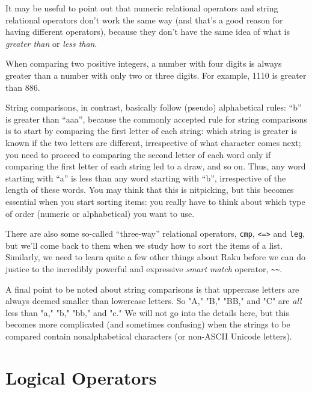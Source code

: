 It may be useful to point out that numeric relational operators 
and string relational operators don't work the same way (and 
that's a good reason for having different operators), because 
they don't have the same idea of what is \emph{greater than} 
or \emph{less than}.

When comparing two positive integers, a number with four digits
is always greater than a number with only two or three digits. 
For example, 1110 is greater than 886. 

String comparisons, in contrast, basically follow (pseudo) 
alphabetical rules: ``b'' is greater than ``aaa'', because 
the commonly accepted rule for string comparisons is to start 
by comparing the first letter of each string: which string 
is greater is known if the two letters are different, 
irrespective of what character comes next; you need to proceed 
to comparing the second letter of each word only if comparing 
the first letter of each string led to a draw, and so on. 
Thus, any word starting with ``a'' is less than any word 
starting with ``b'', irrespective of the length of these 
words. You may think that this is nitpicking, but this 
becomes essential when you start sorting items: you really 
have to think about which type of order (numeric or 
alphabetical) you want to use.

There are also some so-called ``three-way'' relational operators, 
{\tt cmp}, {\tt <=>} and {\tt leg}, but we'll come back to them 
when we study how to sort the items of a list. Similarly, we need 
to learn quite a few other things about Raku before we can do 
justice to the incredibly powerful and expressive \emph{smart match} 
operator, \verb"~~".
\ifplastex \else
{}
\fi

A final point to be noted about string comparisons is 
that uppercase letters are always deemed smaller 
than lowercase letters. So "A," "B," "BB," and "C" 
are \emph{all} less than "a," "b," "bb," and "c." We 
will not go into the details here, but this becomes 
more complicated (and sometimes confusing) when 
the strings to be compared contain nonalphabetical 
characters (or non-ASCII Unicode letters).

\section{Logical Operators}

